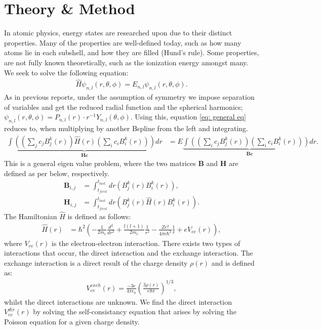 \documentclass[a4paper]{article}
\begin{document}
\section{Theory \& Method}
In atomic physics, energy states are researched upon due to their distinct properties.
Many of the properties are well-defined today, such as how many atoms lie in each subshell, and how they are filled (Hund's rule).
Some properties, are not fully known theoretically, such as the ionization energy amongst many.
We seek to solve the following equation:
\begin{align}
    \hat{H}\psi_{n,l}(r, \theta, \phi) = E_{n,l}\psi_{n,l}(r, \theta, \phi).\label{eq: general eq}
\end{align}As in previous reports, under the assumption of symmetry we impose separation of variables and get the reduced radial function and the spherical harmonics; $\psi_{n,l}(r, \theta, \phi) = P_{n,l}(r)\cdot r^{-1} Y_{n,l}(\theta, \phi)$.
Using this, equation \eqref{eq: general eq} reduces to, when multiplying by another Bspline from the left and integrating.
\begin{align}
    \underbrace{\int\left(\left(\sum_j c_j B_j^k(r)\right)\hat{H}(r)\left(\sum_i c_i B_i^k(r)\right)\right)dr}_{\mathbf{H}\mathbf{c}} &= E\underbrace{\int\left(\left(\sum_i c_j B_j^k(r)\right)\left(\sum_i c_i B_i^k(r)\right)\right)dr}_{\mathbf{B}\mathbf{c}}.\label{eq: gen eq}
\end{align}This is a general eigen value problem, where the two matrices $\mathbf{B}$ and $\mathbf{H}$ are defined as per below, respectively.
\begin{align}
    \mathbf{B}_{i, j} &= \int_{t_{first}}^{t_{last}}dr\left(B_{j}^k(r)B_i^k(r)\right),\label{eq: B}\\
    \mathbf{H}_{i, j} &= \int_{t_{first}}^{t_{last}}dr\left(B_{j}^k(r)\hat{H}(r)B_i^k(r)\right).\nonumber
\end{align}The Hamiltonian $\hat{H}$ is defined as follows:
\begin{align}
    \hat{H}(r) &= \hbar^2\left(-\frac{1}{2m_e}\frac{d^2}{dr^2} + \frac{l(l + 1)}{2m_e}\frac{1}{r^2} - \frac{Ze^2}{4\pi\epsilon\hbar^2}\frac{1}{r} + e V_{ee}(r)\right),\label{eq: hamiltonian}
\end{align}where $V_{ee}(r)$ is the electron-electron interaction.
There exists two types of interactions that occur, the direct interaction and the exchange interaction. The exchange interaction is a direct result of the charge density $\rho(r)$ and is defined as:
\begin{align}
    V_{ee}^{exch}(r) = \frac{-3e}{4\pi\epsilon_0}\left(\frac{3\rho(r)}{e8\pi}\right)^{1/3},
\end{align}whilst the direct interactions are unknown. We find the direct interaction $V_{ee}^{dir}(r)$ by solving the self-consistancy equation that arises by solving the Poisson equation for a given charge density.
\end{document}
